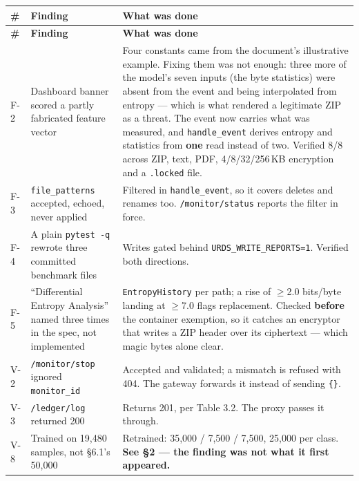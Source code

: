 \documentclass[11pt,a4paper]{article}
\begin{document}
\begin{xltabular}{\linewidth}{@{}K{0.9cm}Y{0.72}Y{1.28}@{}}
\toprule
\textbf{\#} & \textbf{Finding} & \textbf{What was done} \\
\midrule
\endfirsthead
\toprule
\textbf{\#} & \textbf{Finding} & \textbf{What was done} \\
\midrule
\endhead
\bottomrule
\endfoot

F-2 & Dashboard banner scored a partly fabricated feature vector
    & Four constants came from the document's illustrative example. Fixing them was not
      enough: three more of the model's seven inputs (the byte statistics) were absent
      from the event and being interpolated from entropy --- which is what rendered a
      legitimate ZIP as a threat. The event now carries what was measured, and
      \texttt{handle\_event} derives entropy and statistics from \textbf{one} read instead
      of two. Verified 8/8 across ZIP, text, PDF, 4/8/32/256\,KB encryption and a
      \texttt{.locked} file. \\

F-3 & \texttt{file\_patterns} accepted, echoed, never applied
    & Filtered in \texttt{handle\_event}, so it covers deletes and renames too.
      \texttt{/monitor/status} reports the filter in force. \\

F-4 & A plain \texttt{pytest -q} rewrote three committed benchmark files
    & Writes gated behind \texttt{URDS\_WRITE\_REPORTS=1}. Verified both directions. \\

F-5 & ``Differential Entropy Analysis'' named three times in the spec, not implemented
    & \texttt{EntropyHistory} per path; a rise of $\geq$2.0 bits/byte landing at
      $\geq$7.0 flags replacement. Checked \textbf{before} the container exemption, so it
      catches an encryptor that writes a ZIP header over its ciphertext --- which magic
      bytes alone clear. \\

V-2 & \texttt{/monitor/stop} ignored \texttt{monitor\_id}
    & Accepted and validated; a mismatch is refused with 404. The gateway forwards it
      instead of sending \texttt{\{\}}. \\

V-3 & \texttt{/ledger/log} returned 200
    & Returns 201, per Table 3.2. The proxy passes it through. \\

V-8 & Trained on 19,480 samples, not \S6.1's 50,000
    & Retrained: 35,000 / 7,500 / 7,500, 25,000 per class. \textbf{See \S2 --- the finding
      was not what it first appeared.} \\


\end{xltabular}
\end{document}
